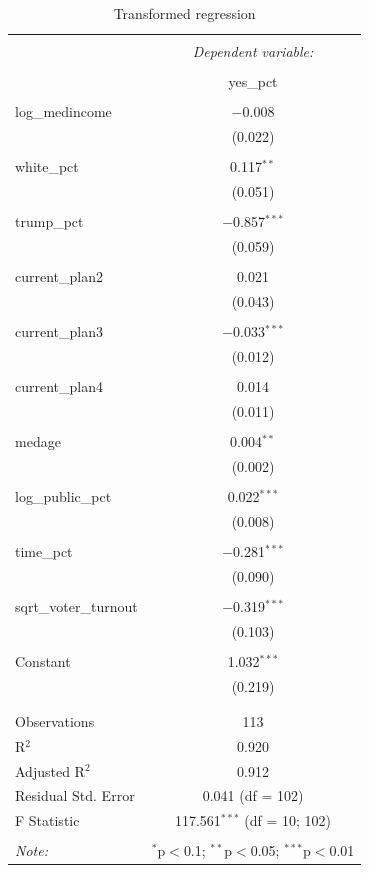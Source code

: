 \documentclass[
]{article}
\begin{document}
\begin{table}[!htbp] \centering 
  \caption{Transformed regression} 
  \label{Transformed} 
\begin{tabular}{@{\extracolsep{5pt}}lc} 
\\[-1.8ex]\hline 
\hline \\[-1.8ex] 
 & \multicolumn{1}{c}{\textit{Dependent variable:}} \\ 
\cline{2-2} 
\\[-1.8ex] & yes\_pct \\ 
\hline \\[-1.8ex] 
 log\_medincome & $-$0.008 \\ 
  & (0.022) \\ 
  & \\ 
 white\_pct & 0.117$^{**}$ \\ 
  & (0.051) \\ 
  & \\ 
 trump\_pct & $-$0.857$^{***}$ \\ 
  & (0.059) \\ 
  & \\ 
 current\_plan2 & 0.021 \\ 
  & (0.043) \\ 
  & \\ 
 current\_plan3 & $-$0.033$^{***}$ \\ 
  & (0.012) \\ 
  & \\ 
 current\_plan4 & 0.014 \\ 
  & (0.011) \\ 
  & \\ 
 medage & 0.004$^{**}$ \\ 
  & (0.002) \\ 
  & \\ 
 log\_public\_pct & 0.022$^{***}$ \\ 
  & (0.008) \\ 
  & \\ 
 time\_pct & $-$0.281$^{***}$ \\ 
  & (0.090) \\ 
  & \\ 
 sqrt\_voter\_turnout & $-$0.319$^{***}$ \\ 
  & (0.103) \\ 
  & \\ 
 Constant & 1.032$^{***}$ \\ 
  & (0.219) \\ 
  & \\ 
\hline \\[-1.8ex] 
Observations & 113 \\ 
R$^{2}$ & 0.920 \\ 
Adjusted R$^{2}$ & 0.912 \\ 
Residual Std. Error & 0.041 (df = 102) \\ 
F Statistic & 117.561$^{***}$ (df = 10; 102) \\ 
\hline 
\hline \\[-1.8ex] 
\textit{Note:}  & \multicolumn{1}{l}{$^{*}$p$<$0.1; $^{**}$p$<$0.05; $^{***}$p$<$0.01} \\ 
\end{tabular} 
\end{table}
\end{document}
